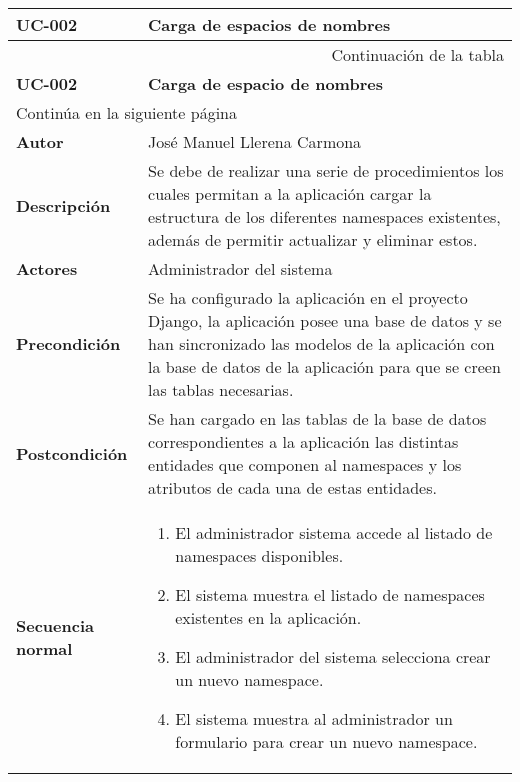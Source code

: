 \begin{center}
\begin{longtable}{||p{3.4cm}|p{12cm}||}
 \hline \hline \bf UC-002 &  \bf Carga de espacios de nombres \\
\hline
\endfirsthead
\hline \multicolumn{2}{|r|}{{Continuación de la tabla}} \\ \hline
 \hline \bf UC-002 &  \bf Carga de espacio de nombres \\
\hline
\endhead
\hline \multicolumn{2}{|l|}{{Continúa en la siguiente página}} \\ \hline
\endfoot
\endlastfoot
 \hline \bf Autor & José Manuel Llerena Carmona \\
 \hline \bf Descripción & Se debe de realizar una serie de procedimientos los
             cuales permitan a la aplicación cargar la estructura de los
             diferentes namespaces existentes, además de permitir actualizar y
             eliminar estos.\\
 \hline \bf Actores & Administrador del sistema\\
 \hline \bf Precondición & Se ha configurado la aplicación en el proyecto
             Django, la aplicación posee una base de datos y se han sincronizado
             las modelos de la aplicación con la base de datos de la aplicación
             para que se creen las tablas necesarias.\\
 \hline \bf Postcondición & Se han cargado en las tablas de la base de datos
             correspondientes a la aplicación las distintas entidades que
             componen al namespaces y los atributos de cada una de estas
             entidades.\\
 \hline \bf Secuencia normal & 
             \begin{enumerate}
                \item El administrador sistema accede al listado de namespaces
                       disponibles.
                \item El sistema muestra el listado de namespaces existentes en
                       la aplicación.
                \item El administrador del sistema selecciona crear un nuevo
                       namespace.
                \item El sistema muestra al administrador un formulario para
                       crear un nuevo namespace.

\end{enumerate}
\end{longtable}
\end{center}
